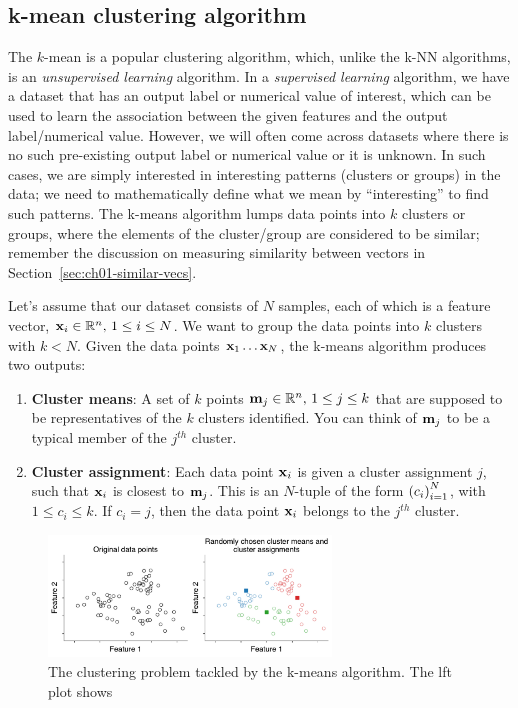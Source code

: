 \subsection{k-mean clustering algorithm}
The $k$-mean is a popular clustering algorithm, which, unlike the k-NN algorithms, is an \textit{unsupervised learning} algorithm. In a \textit{supervised learning} algorithm, we have a dataset that has an output label or numerical value of interest, which can be used to learn the association between the given features and the output label/numerical value. However, we will often come across datasets where there is no such pre-existing output label or numerical value or it is unknown. In such cases, we are simply interested in interesting patterns (clusters or groups) in the data; we need to mathematically define what we mean by ``interesting'' to find such patterns. The k-means algorithm lumps data points into $k$ clusters or groups, where the elements of the cluster/group are considered to be similar; remember the discussion on measuring similarity between vectors in Section~\ref{sec:ch01-similar-vecs}.

Let's assume that our dataset consists of $N$ samples, each of which is a feature vector, $\mathbf{x}_i \in \mathbb{R}^n, \, 1 \leq i \leq N$. We want to group the data points into $k$ clusters with $k < N$. Given the data points $\mathbf{x}_1 \ldots \mathbf{x}_N$, the k-means algorithm produces two outputs:
\begin{enumerate}
    \item \textbf{Cluster means}: A set of $k$ points $\mathbf{m}_j \in \mathbb{R}^n, \, 1 \leq j \leq k$ that are supposed to be representatives of the $k$ clusters identified. You can think of $\mathbf{m}_j$ to be a typical member of the $j^{th}$ cluster.
    \item \textbf{Cluster assignment}: Each data point $\mathbf{x}_i$ is given a cluster assignment $j$, such that $\mathbf{x}_i$ is closest to $\mathbf{m}_j$. This is an $N$-tuple of the form $\left( c_i \right)_{i=1}^N$, with $1 \leq c_i \leq k$. If $c_i = j$, then the data point $\mathbf{x}_i$ belongs to the $j^{th}$ cluster.
\end{enumerate}

\begin{figure}
    \centering
    \includegraphics[width=0.67\textwidth]{figure/chapter01/kmeans-demo.pdf}
    \caption{The clustering problem tackled by the k-means algorithm. The lft plot shows  }
    \label{fig:ch01-kmeans-demo}
\end{figure}

